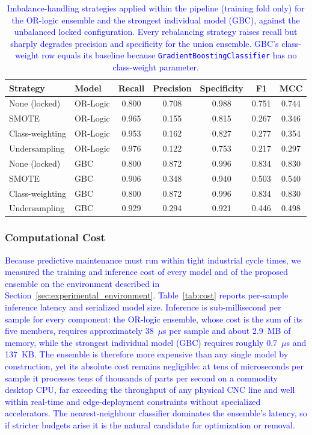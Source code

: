 \documentclass[final,5p, twocolumn]{elsarticle}
\begin{document}
\begin{table}[htbp]
\centering
\caption{\textcolor{blue}{Imbalance-handling strategies applied within the pipeline (training fold only) for the OR-logic ensemble and the strongest individual model (GBC), against the unbalanced locked configuration. Every rebalancing strategy raises recall but sharply degrades precision and specificity for the union ensemble. GBC's class-weight row equals its baseline because \texttt{GradientBoostingClassifier} has no class-weight parameter.}}
\label{tab:imbalance}
\begin{tabular}{llccccc}
\hline
Strategy & Model & Recall & Precision & Specificity & F1 & MCC \\
\hline
None (locked)        & OR-Logic & 0.800 & 0.708 & 0.988 & 0.751 & 0.744 \\
SMOTE                & OR-Logic & 0.965 & 0.155 & 0.815 & 0.267 & 0.346 \\
Class-weighting      & OR-Logic & 0.953 & 0.162 & 0.827 & 0.277 & 0.354 \\
Undersampling        & OR-Logic & 0.976 & 0.122 & 0.753 & 0.217 & 0.297 \\
\hline
None (locked)        & GBC & 0.800 & 0.872 & 0.996 & 0.834 & 0.830 \\
SMOTE                & GBC & 0.906 & 0.348 & 0.940 & 0.503 & 0.540 \\
Class-weighting      & GBC & 0.800 & 0.872 & 0.996 & 0.834 & 0.830 \\
Undersampling        & GBC & 0.929 & 0.294 & 0.921 & 0.446 & 0.498 \\
\hline
\end{tabular}
\end{table}

\subsubsection{Computational Cost}
\textcolor{blue}{Because predictive maintenance must run within tight industrial cycle times, we measured the training and inference cost of every model and of the proposed ensemble on the environment described in Section~\ref{sec:experimental_environment}. Table~\ref{tab:cost} reports per-sample inference latency and serialized model size. Inference is sub-millisecond per sample for every component: the OR-logic ensemble, whose cost is the sum of its five members, requires approximately 38~$\mu$s per sample and about 2.9~MB of memory, while the strongest individual model (GBC) requires roughly 0.7~$\mu$s and 137~KB. The ensemble is therefore more expensive than any single model by construction, yet its absolute cost remains negligible: at tens of microseconds per sample it processes tens of thousands of parts per second on a commodity desktop CPU, far exceeding the throughput of any physical CNC line and well within real-time and edge-deployment constraints without specialized accelerators. The nearest-neighbour classifier dominates the ensemble's latency, so if stricter budgets arise it is the natural candidate for optimization or removal.}
\end{document}
